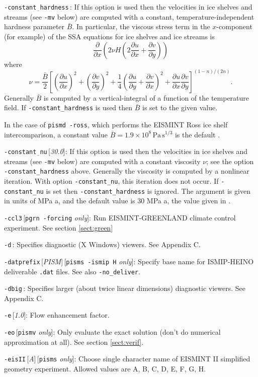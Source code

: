 \documentclass[11pt,final]{amsart}
\newcommand{\ddx}[1]{\ensuremath{\frac{\partial #1}{\partial x}}}
\newcommand{\ddy}[1]{\ensuremath{\frac{\partial #1}{\partial y}}}
\newcommand{\rawopt}[1]{\vspace{1mm}\noindent \large\texttt{-#1}\normalsize}
\newcommand{\opt}[1]{\rawopt{#1}\,:\quad}
\newcommand{\optdef}[2]{\rawopt{#1}\,[\textsl{#2}]:\quad}
\newcommand{\optrestrict}[2]{\rawopt{#1}\,[\texttt{#2} \textsl{only}]:\quad}
\newcommand{\optdefrestrict}[3]{\rawopt{#1}\,[\textsl{#2}]\,[\texttt{#3} \textsl{only}]:\quad}
\newcommand{\und}{$\underline{\,\,\,}$}
\begin{document}
\opt{constant\und hardness}  If this option is used then the velocities in ice shelves and streams (see \verb|-mv| below) are computed with a constant, temperature-independent hardness parameter $\bar B$.  In particular, the viscous stress term in the $x$-component (for example) of the SSA equations for ice shelves and ice streams is
	$$\ddx{}\left(2\nu H\left(2\ddx{u} + \ddy{v}\right)\right)$$
where 
	$$\nu = \frac{\bar B}{2} \left[\left(\ddx{u}\right)^2 + \left(\ddy{v}\right)^2 +
  \frac{1}{4} \left(\ddy{u} + \ddx{v}\right)^2 + \ddx{u}\ddy{v}\right]^{(1-n)/(2n)}.$$
Generally $\bar B$ is computed by a vertical-integral of a function of the temperature field.  If \verb|-constant_hardness| is used then $\bar B$ is set to the given value.

In the case of \verb|pismd -ross|, which performs the EISMINT Ross ice shelf intercomparison, a constant value $\bar B = 1.9 \times 10^8 \, \text{Pa}\, \text{s}^{1/3}$ is the default \cite{MacAyealetal}.

\optdef{constant\und nu}{30.0}  If this option is used then the velocities in ice shelves and streams (see \verb|-mv| below) are computed with a constant viscosity $\nu$; see the option \verb|-constant_hardness| above.  Generally the viscosity is computed by a nonlinear iteration.  With option \verb|-constant_nu|, this iteration does not occur.  If \verb|-constant_nu| is set then \verb|-constant_hardness| is ignored.  The argument is given in units of MPa a, and the default value is $30$ MPa a, the value given in \cite{Ritzetal2001}.

\optrestrict{ccl3}{pgrn -forcing}    Run EISMINT-GREENLAND climate control experiment. See section \ref{sect:green}

\opt{d}  Specifies diagnostic (X Windows) viewers.  See Appendix C.

\optdefrestrict{datprefix}{PISM}{pisms -ismip H}  Specify base name for ISMIP-HEINO deliverable \verb|.dat| files.  See also \verb|-no_deliver|.

\opt{dbig}  Specifies larger (about twice linear dimensions) diagnostic viewers.  See Appendix C.

\optdef{e}{1.0}  Flow enhancement factor.

\optrestrict{eo}{pismv}  Only evaluate the exact solution (don't do numerical approximation at all).  See section \ref{sect:verif}.

\optdefrestrict{eisII}{A}{pisms}  Choose single character name of EISMINT II \cite{EISMINT00} simplified geometry experiment.  Allowed values are A, B, C, D, E, F, G, H.
\end{document}
